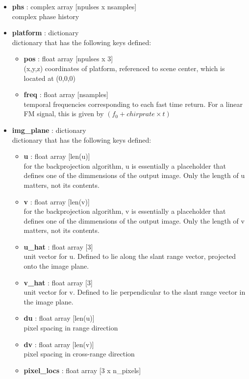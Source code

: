 \documentclass{article}
\newcommand{\defs}[2]{\textbf{{#1}} : {#2}}
\begin{document}
\begin{itemize}
	\item \defs{phs}{complex array [npulses x nsamples]}\\
  	complex phase history
  	\item \defs{platform}{dictionary}\\
  	dictionary that has the following keys defined:
	\begin{itemize}
	    \item \defs{pos}{float array [npulses x 3]}\\
	       	(x,y,z) coordinates of platform, referenced to scene center, which is located at (0,0,0)
		\item\defs{freq}{float array [nsamples]}\\
	    	temporal frequencies corresponding to each fast time return.  For a linear FM signal, this is given by $(f_0+chirprate\times t)$
	\end{itemize}
  	\item \defs{img\_plane}{dictionary}\\
  	dictionary that has the following keys defined:
	\begin{itemize}
	    \item \defs{u}{float array [len(u)]}\\
	    	for the backprojection algorithm, u is essentially a placeholder that defines one of the dimmensions of the output image.  Only the length of u matters, not its contents.
	    \item \defs{v}{float array [len(v)]}\\
	    	for the backprojection algorithm, v is essentially a placeholder that defines one of the dimmensions of the output image.  Only the length of v matters, not its contents.
		\item \defs{u\_hat}{float array [3]}\\
	    	unit vector for u.  Defined to lie along the slant range vector, projected onto the image plane.
		\item \defs{v\_hat}{float array [3]}\\
	    	unit vector for v.  Defined to lie perpendicular to the slant range vector in the image plane.
		\item \defs{du}{float array [len(u)]}\\
	    	pixel spacing in range direction
		\item \defs{dv}{float array [len(v)]}\\
	    	pixel spacing in cross-range direction
	    \item \defs{pixel\_locs}{float array [3 x n\_pixels]}\\

\end{itemize}
\end{itemize}
\end{document}
